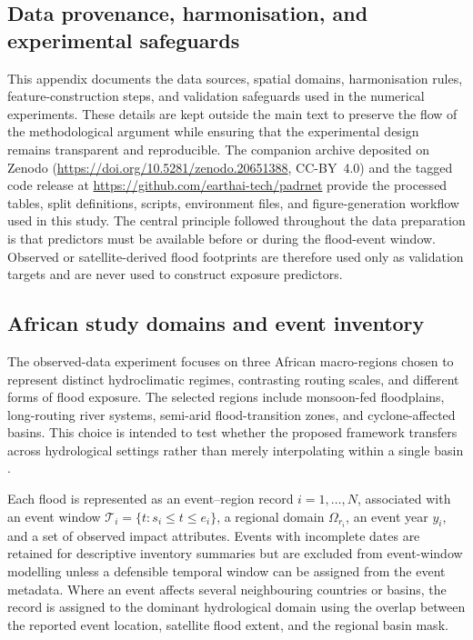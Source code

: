 \documentclass[pdflatex,sn-mathphys-ay]{sn-jnl}
\theoremstyle{thmstyleone}
\begin{document}
\begin{appendices}
\section{Data provenance, harmonisation, and experimental safeguards}
\label{app:data_experimental_details}

This appendix documents the data sources, spatial domains,
harmonisation rules, feature-construction steps, and validation
safeguards used in the numerical experiments.  These details are kept
outside the main text to preserve the flow of the methodological
argument while ensuring that the experimental design remains
transparent and reproducible.  The companion archive deposited on
Zenodo (\url{https://doi.org/10.5281/zenodo.20651388}, CC-BY~4.0) and
the tagged code release at \url{https://github.com/earthai-tech/padrnet}
provide the processed tables, split definitions, scripts, environment
files, and figure-generation workflow used in this study.  The central
principle followed throughout the data preparation is that predictors
must be available before or during the flood-event window.  Observed or
satellite-derived flood footprints are therefore used only as
validation targets and are never used to construct exposure
predictors.

\subsection{African study domains and event inventory}
\label{app:study_domains}

The observed-data experiment focuses on three African macro-regions
chosen to represent distinct hydroclimatic regimes, contrasting
routing scales, and different forms of flood exposure.  The selected
regions include monsoon-fed floodplains, long-routing river systems,
semi-arid flood-transition zones, and cyclone-affected basins.  This
choice is intended to test whether the proposed framework transfers
across hydrological settings rather than merely interpolating within a
single basin \citep{DiBaldassarre2010,Thiemig2015,Nikulin2012,Dosio2017,Bodian2018}.



Each flood is represented as an event--region record
$i=1,\ldots,N$, associated with an event window
$\mathcal{T}_{i}=\{t:s_i\leq t\leq e_i\}$, a regional domain
$\Omega_{r_i}$, an event year $y_i$, and a set of observed impact
attributes.  Events with incomplete dates are retained for descriptive
inventory summaries but are excluded from event-window modelling
unless a defensible temporal window can be assigned from the event
metadata.  Where an event affects several neighbouring countries or
basins, the record is assigned to the dominant hydrological domain
using the overlap between the reported event location, satellite
flood extent, and the regional basin mask.


\end{appendices}
\end{document}
